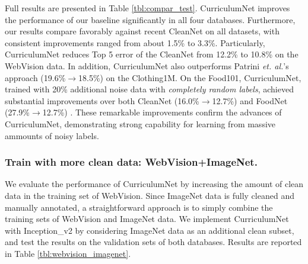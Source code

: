 \documentclass[runningheads]{llncs}
\begin{document}
Full results are presented in Table \ref{tbl:compar_test}. CurriculumNet improves the performance of our baseline significantly in all four databases. Furthermore, our results compare favorably against recent CleanNet on all datasets, with consistent improvements ranged from about 1.5\% to 3.3\%. Particularly, CurriculumNet reduces Top 5 error of the CleanNet from 12.2\% to 10.8\% on the WebVision data. In addition, CurriculumNet also outperforms Patrini \emph{et. al.}'s approach (19.6\%$\rightarrow$18.5\%) \cite{Patrini2017} on the Clothing1M. On the Food101, CurriculumNet, trained with 20\% additional noise data with \emph{completely random labels}, achieved substantial improvements over both CleanNet (16.0\%$\rightarrow$12.7\%) and FoodNet (27.9\%$\rightarrow$12.7\%) \cite{pandey2017foodnet}. These remarkable improvements confirm the advances of CurriculumNet, demonstrating strong capability for learning from massive ammounts of noisy labels.

\subsubsection{Train with more clean data: WebVision+ImageNet.}
We evaluate the performance of CurriculumNet by increasing the amount of clean data in the training set of WebVision. Since ImageNet data is fully cleaned and manually annotated, a straightforward approach is to simply combine the training sets of WebVision and ImageNet data. We implement CurriculumNet with Inception\_v2 by considering ImageNet data as an additional clean subset, and test the results on the validation sets of both databases. Results are reported in Table \ref{tbl:webvision_imagenet}.
\end{document}
